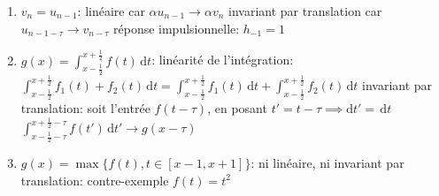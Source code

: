 \documentclass[12pt]{article}
\begin{document}
\begin{enumerate}
\item $v_n = u_{n-1}$: \newline
linéaire car $\alpha u_{n-1} \rightarrow \alpha v_n$ \newline
invariant par translation car $u_{n-1-\tau} \rightarrow v_{n-\tau}$ \newline
réponse impulsionnelle: $h_{-1} = 1$
\item $g(x) = \int_{x-\frac{1}{2}}^{x+\frac{1}{2}} f(t) \,\mathrm{d}t$: \newline
linéarité de l'intégration: $\int_{x-\frac{1}{2}}^{x+\frac{1}{2}} f_1(t) + f_2(t) \,\mathrm{d}t = \int_{x-\frac{1}{2}}^{x+\frac{1}{2}} f_1(t) \,\mathrm{d}t+ \int_{x-\frac{1}{2}}^{x+\frac{1}{2}} f_2(t) \,\mathrm{d}t$ \newline
invariant par translation: soit l'entrée $f(t-\tau)$, en posant $t' = t -\tau \implies \mathrm{d}t' = \,\mathrm{d}t $ \newline $\int_{x-\frac{1}{2}-\tau}^{x+\frac{1}{2}-\tau} f(t')\,\mathrm{d}t' \rightarrow g(x-\tau)$
\item $g(x) = \max\{f(t), t \in {[x-1, x+1]}\}$: \newline
ni linéaire, ni invariant par translation: contre-exemple $f(t) = t^2$ \newline

\end{enumerate}
\end{document}
